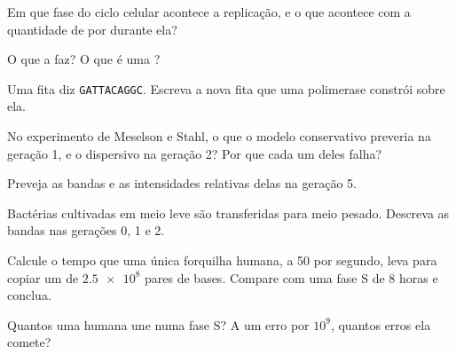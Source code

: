 \begin{exercise}[$\star$]\label{exo:g11:dna-replication:3}
Em que fase do ciclo celular acontece a replicação, e o que acontece
com a quantidade de  por  durante ela?
\end{exercise}

\begin{exercise}[$\star$]\label{exo:g11:dna-replication:4}
O que a  faz? O que é uma ?
\end{exercise}

\begin{exercise}[$\star$]\label{exo:g11:dna-replication:5}
Uma fita diz \texttt{GATTACAGGC}. Escreva a nova fita que uma
polimerase constrói sobre ela.
\end{exercise}

\begin{exercise}[$\star\star$]\label{exo:g11:dna-replication:6}
No experimento de Meselson e Stahl, o que o modelo conservativo
preveria na geração 1, e o dispersivo na geração 2? Por que cada um
deles falha?
\end{exercise}

\begin{exercise}[$\star\star$]\label{exo:g11:dna-replication:7}
Preveja as bandas e as intensidades relativas delas na geração 5.
\end{exercise}

\begin{exercise}[$\star\star$]\label{exo:g11:dna-replication:8}
Bactérias cultivadas em meio leve são transferidas para meio pesado.
Descreva as bandas nas gerações 0, 1 e 2.
\end{exercise}

\begin{exercise}[$\star\star$]\label{exo:g11:dna-replication:9}
Calcule o tempo que uma única forquilha humana, a 50  por
segundo, leva para copiar um  de $\num{2.5e8}$ pares de
bases. Compare com uma fase S de 8 horas e conclua.
\end{exercise}

\begin{exercise}[$\star\star$]\label{exo:g11:dna-replication:10}
Quantos  uma  humana une numa fase S? A um erro por
$10^9$, quantos erros ela comete?
\end{exercise}

